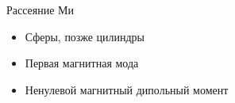\begin{frame}{Рассеяние Ми}
\begin{minipage}[t][\textheight]{.5\textwidth}
		\begin{itemize}
			\item Сферы, позже цилиндры
			\item Первая магнитная мода
			\item Ненулевой магнитный дипольный момент	
		\end{itemize}
	\end{minipage}
\end{frame}
